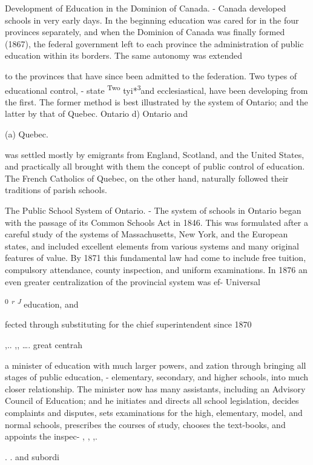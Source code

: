 \documentclass[
]{book}
\begin{document}
Development of Education in the Dominion of Canada. - Canada developed schools in very early days. In the beginning education was cared for in the four provinces separately, and when the Dominion of Canada was finally formed (1867), the federal government left to each province the administration of public education within its borders. The same autonomy was extended

to the provinces that have since been admitted to the federation. Two types of educational control, - state \textsuperscript{Two} tyi*\textsuperscript{3}and ecclesiastical, have been developing from the first. The former method is best illustrated by the system of Ontario; and the latter by that of Quebec. Ontario d) Ontario and

(a) Quebec.

was settled mostly by emigrants from England, Scotland, and the United States, and practically all brought with them the concept of public control of education. The French Catholics of Quebec, on the other hand, naturally followed their traditions of parish schools.

The Public School System of Ontario. - The system of schools in Ontario began with the passage of its Common Schools Act in 1846. This was formulated after a careful study of the systems of Massachusetts, New York, and the European states, and included excellent elements from various systems and many original features of value. By 1871 this fundamental law had come to include free tuition, compulsory attendance, county inspection, and uniform examinations. In 1876 an even greater centralization of the provincial system was ef- Universal

\textsuperscript{0} \emph{\textsuperscript{r} \textsuperscript{J}} education, and

fected through substituting for the chief superintendent since 1870

,.. ,, \ldots. great centrah

a minister of education with much larger powers, and zation through bringing all stages of public education, - elementary, secondary, and higher schools, into much closer relationship. The minister now has many assistants, including an Advisory Council of Education; and he initiates and directs all school legislation, decides complaints and disputes, sets examinations for the high, elementary, model, and normal schools, prescribes the courses of study, chooses the text-books, and appoints the inspec- , , ,.

. . and subordi
\end{document}
